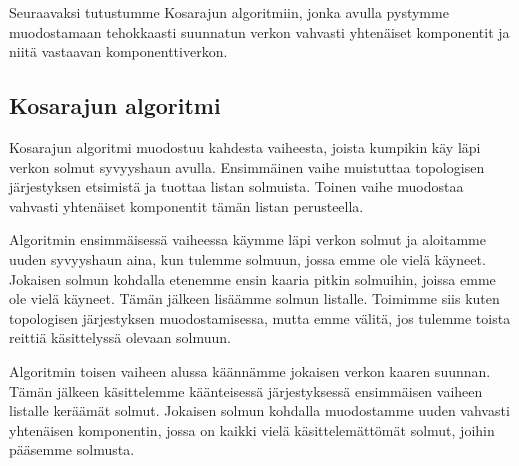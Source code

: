 Seuraavaksi tutustumme Kosarajun algoritmiin,
jonka avulla pystymme muodostamaan tehokkaasti suunnatun
verkon vahvasti yhtenäiset komponentit ja niitä
vastaavan komponenttiverkon.

\subsection{Kosarajun algoritmi}

Kosarajun algoritmi muodostuu kahdesta vaiheesta,
joista kumpikin käy läpi verkon solmut syvyyshaun avulla.
Ensimmäinen vaihe muistuttaa topologisen järjestyksen
etsimistä ja tuottaa listan solmuista.
Toinen vaihe muodostaa vahvasti yhtenäiset komponentit
tämän listan perusteella.

Algoritmin ensimmäisessä vaiheessa käymme läpi verkon
solmut ja aloitamme uuden syvyyshaun aina,
kun tulemme solmuun, jossa emme ole vielä käyneet.
Jokaisen solmun kohdalla etenemme ensin kaaria pitkin
solmuihin, joissa emme ole vielä käyneet.
Tämän jälkeen lisäämme solmun listalle.
Toimimme siis kuten topologisen järjestyksen muodostamisessa,
mutta emme välitä, jos tulemme toista reittiä
käsittelyssä olevaan solmuun.

Algoritmin toisen vaiheen alussa
käännämme jokaisen verkon kaaren suunnan.
Tämän jälkeen käsittelemme käänteisessä järjestyksessä
ensimmäisen vaiheen listalle keräämät solmut.
Jokaisen solmun kohdalla muodostamme uuden vahvasti yhtenäisen
komponentin, jossa on kaikki vielä käsittelemät\-tömät solmut,
joihin pääsemme solmusta.

